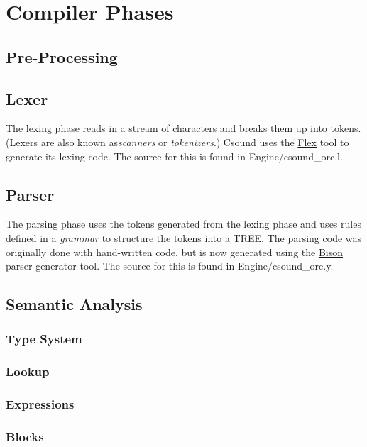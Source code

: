\documentclass[]{book}
\begin{document}
\section{Compiler Phases}

\subsection{Pre-Processing}

\subsection{Lexer}

The lexing phase reads in a stream of characters and breaks them up into
tokens. (Lexers are also known as\emph{scanners} or \emph{tokenizers}.)
Csound uses the \href{http://flex.sourceforge.net/}{Flex} tool to
generate its lexing code. The source for this is found in
Engine/csound\_orc.l.

\subsection{Parser}

The parsing phase uses the tokens generated from the lexing phase and
uses rules defined in a \emph{grammar} to structure the tokens into a
TREE. The parsing code was originally done with hand-written code, but
is now generated using the
\href{http://www.gnu.org/software/bison/}{Bison} parser-generator tool.
The source for this is found in Engine/csound\_orc.y.

\subsection{Semantic Analysis}

\subsubsection{Type System}

\subsubsection{Lookup}

\subsubsection{Expressions}

\subsubsection{Blocks}
\end{document}
